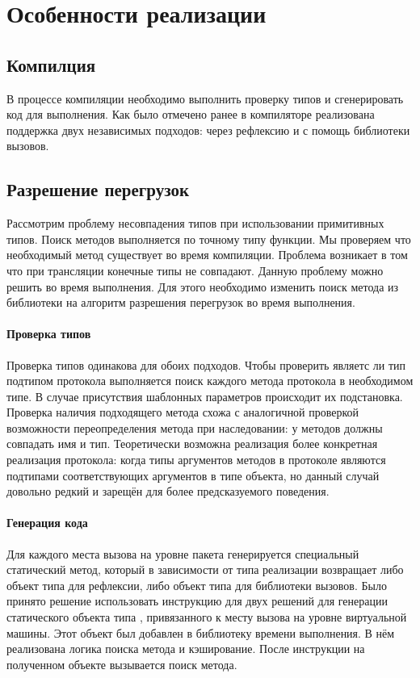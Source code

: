 \section{Особенности реализации}

\subsection{Компилция}
В процессе компиляции необходимо выполнить проверку типов и сгенерировать код для выполнения. Как было отмечено ранее в компиляторе реализована поддержка двух независимых подходов: через рефлексию и с помощь библиотеки вызовов.

\subsection{Разрешение перегрузок}
Рассмотрим проблему несовпадения типов при использовании примитивных типов. Поиск методов выполняется по точному типу функции. Мы проверяем что необходимый метод существует во время компиляции. Проблема возникает в том что при трансляции конечные типы не совпадают. Данную проблему можно решить во время выполнения. Для этого необходимо изменить поиск метода из библиотеки на алгоритм разрешения перегрузок во время выполнения.

\paragraph{Проверка типов}
Проверка типов одинакова для обоих подходов. Чтобы проверить являетс ли тип подтипом протокола выполняется поиск каждого метода протокола в необходимом типе. В случае присутствия шаблонных параметров происходит их подстановка. Проверка наличия подходящего метода схожа с аналогичной проверкой возможности переопределения метода при наследовании: у методов должны совпадать имя и тип. Теоретически возможна реализация более конкретная реализация протокола: когда типы аргументов методов в протоколе являются подтипами соответствующих аргументов в типе объекта, но данный случай довольно редкий и зарещён для более предсказуемого поведения.

\paragraph{Генерация кода}
Для каждого места вызова на уровне пакета генерируется специальный статический метод, который в зависимости от типа реализации возвращает либо объект типа  для рефлексии, либо объект типа  для библиотеки вызовов. Было принято решение использовать инструкцию  для двух решений для генерации статического объекта типа , привязанного к месту вызова на уровне виртуальной машины. Этот объект был добавлен в библиотеку времени выполнения. В нём реализована логика поиска метода и кэширование. После инструкции  на полученном объекте вызывается поиск метода.

